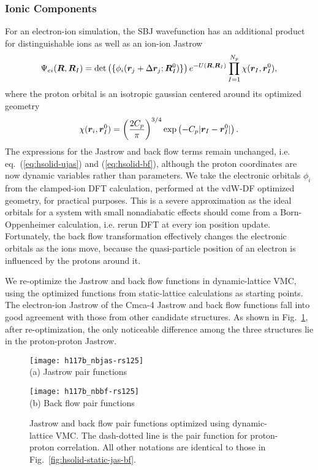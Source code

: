 \subsubsection{Ionic Components}
For an electron-ion simulation, the SBJ wavefunction has an additional product for distinguishable ions as well as an ion-ion Jastrow
\begin{align} \label{eq:hsolid-ei-wf}
\Psi_{ei}(\boldsymbol{R}, \boldsymbol{R}_I) = \det\left( \{ \phi_i(\boldsymbol{r}_j+\Delta\boldsymbol{r}_j; \boldsymbol{R}_I^0)\} \right) e^{-U(\boldsymbol{R},\boldsymbol{R}_I)} \prod\limits_{I=1}^{N_p} \chi(\boldsymbol{r}_I, \boldsymbol{r}_I^0),
\end{align}
where the proton orbital is an isotropic gaussian centered around its optimized geometry
\begin{align}
\chi(\boldsymbol{r}_i, \boldsymbol{r}_I^0) = \left(\dfrac{2C_p}{\pi}\right)^{3/4} \exp\left(
-C_p\vert\boldsymbol{r}_I-\boldsymbol{r}_I^0\vert
\right).
\end{align}
The expressions for the Jastrow and back flow terms remain unchanged, i.e. eq.~(\ref{eq:hsolid-ujas}) and (\ref{eq:hsolid-bf}), although the proton coordinates are now dynamic variables rather than parameters.
We take the electronic orbitals $\phi_i$ from the clamped-ion DFT calculation, performed at the vdW-DF optimized geometry, for practical purposes.
This is a severe approximation as the ideal orbitals for a system with small nonadiabatic effects should come from a Born-Oppenheimer calculation, i.e. rerun DFT at every ion position update.
Fortunately, the back flow transformation effectively changes the electronic orbitals as the ions move, because the quasi-particle position of an electron is influenced by the protons around it.

We re-optimize the Jastrow and back flow functions in dynamic-lattice VMC, using the optimized functions from static-lattice calculations as starting points.
The electron-ion Jastrow of the Cmca-4 Jastrow and back flow functions fall into good agreement with those from other candidate structures.
As shown in Fig.~\ref{fig:hsolid-dynamic-jas-bf}, after re-optimization, the only noticeable difference among the three structures lie in the proton-proton Jastrow.

\begin{figure}[h]
\centering
\begin{minipage}{0.49\textwidth}
\centering
\texttt{[image: h117b\_nbjas-rs125]}\\
(a) Jastrow pair functions
\end{minipage}
\begin{minipage}{0.49\textwidth}
\centering
\texttt{[image: h117b\_nbbf-rs125]}\\
(b) Back flow pair functions
\end{minipage}
\caption{Jastrow and back flow pair functions optimized using dynamic-lattice VMC. The dash-dotted line is the pair function for proton-proton correlation. All other notations are identical to those in Fig.~\ref{fig:hsolid-static-jas-bf}.}
\label{fig:hsolid-dynamic-jas-bf}
\end{figure}


